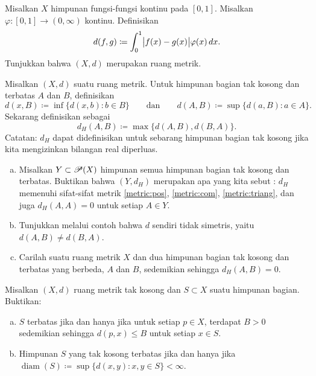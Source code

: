 \begin{exercise}
Misalkan $X$ himpunan fungsi-fungsi kontinu pada $[0,1]$.  Misalkan $\varphi \colon
[0,1] \to (0,\infty)$ kontinu.  Definisikan
\begin{equation*}
d(f,g) \coloneqq \int_0^1 \bigl\lvert {f(x)-g(x)} \bigr\rvert\varphi(x)\,dx .
\end{equation*}
Tunjukkan bahwa $(X,d)$ merupakan ruang metrik.
\end{exercise}

\begin{exercise} \label{exercise:mshausdorffpseudo}
Misalkan $(X,d)$ suatu ruang metrik.  Untuk himpunan bagian tak kosong dan terbatas $A$ dan $B$, definisikan
\begin{equation*}
d(x,B) \coloneqq \inf \bigl\{ d(x,b) : b \in B \bigr\}
\qquad \text{dan} \qquad
d(A,B) \coloneqq \sup \bigl\{ d(a,B) : a \in A \bigr\} .
\end{equation*}
Sekarang definisikan \emph{} sebagai
\begin{equation*}
d_H(A,B) \coloneqq \max \bigl\{ d(A,B) , d(B,A) \bigr\} .
\end{equation*}
Catatan: $d_H$ dapat didefinisikan untuk sebarang himpunan bagian tak kosong jika kita mengizinkan
bilangan real diperluas.
\begin{enumerate}[a)]
\item
Misalkan $Y \subset {\mathscr{P}}(X)$ himpunan semua himpunan bagian tak kosong dan terbatas.
Buktikan bahwa
$(Y,d_H)$ merupakan apa yang kita sebut \emph{}:
$d_H$ memenuhi sifat-sifat metrik
\ref{metric:pos},
\ref{metric:com}, 
\ref{metric:triang}, dan juga
$d_H(A,A) = 0$ untuk setiap $A \in Y$.
\item
Tunjukkan melalui contoh bahwa $d$ sendiri tidak simetris,
yaitu $d(A,B) \neq d(B,A)$.
\item
Carilah suatu ruang metrik $X$ dan dua himpunan bagian tak kosong
dan terbatas yang berbeda, $A$ dan $B$, sedemikian sehingga $d_H(A,B) = 0$.
\end{enumerate}
\end{exercise}

\begin{exercise}
Misalkan $(X,d)$ ruang metrik tak kosong dan $S \subset X$ suatu himpunan bagian.  Buktikan:
\begin{enumerate}[a)]
\item
$S$ terbatas jika dan hanya jika
untuk setiap $p \in X$, terdapat $B > 0$ sedemikian sehingga $d(p,x) \leq B$ untuk
setiap $x \in S$.
\item
Himpunan $S$ yang tak kosong terbatas jika dan hanya jika
$\operatorname{diam}(S) \coloneqq \sup \{ d(x,y) : x,y \in S \} < \infty$.
\end{enumerate}
\end{exercise}

